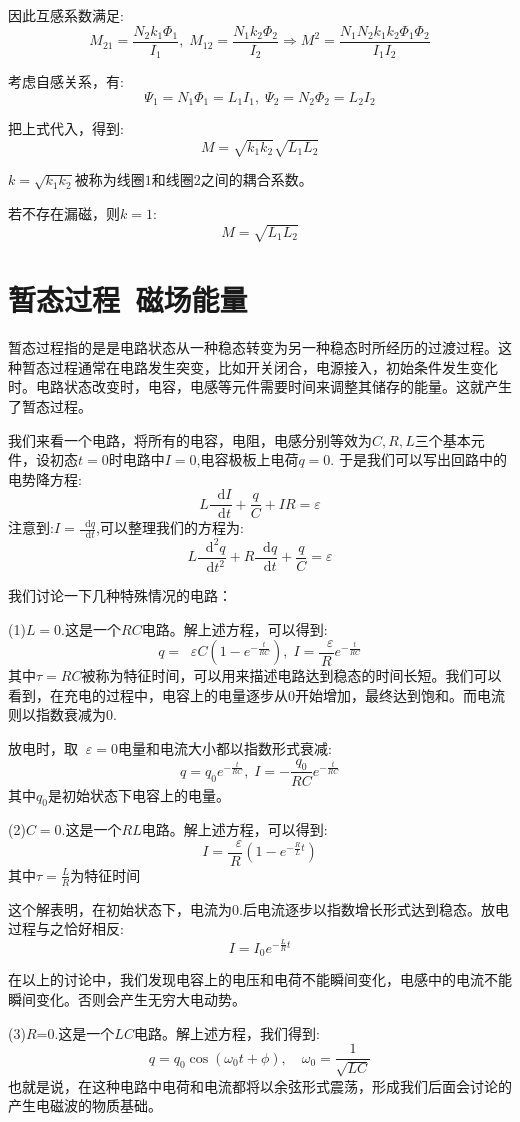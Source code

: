 \documentclass[12pt,a4paper,oneside]{report}
\theoremstyle{definition}
\theoremstyle{remark}
\renewcommand{\d}{\mathop{}\!\mathrm{d}}
\renewcommand{\v}{\mathop{}\!\varepsilon}
\begin{document}
因此互感系数满足:
\[
M_{21}=\frac{N_2k_1\Phi_1}{I_1},\;M_{12}=\frac{N_1k_2\Phi_2}{I_2}\Rightarrow M^2 =\frac{N_1N_2k_1k_2\Phi_1\Phi_2}{I_1I_2}
\]

考虑自感关系，有:
\[
\Psi_1 = N_1 \Phi_1 = L_1 I_1,\;\Psi_2 = N_2 \Phi_2 = L_2 I_2
\]

把上式代入，得到:
\[
M = \sqrt{k_1k_2}\sqrt{L_1L_2}
\]

$k=\sqrt{k_1k_2}$被称为线圈$1$和线圈$2$之间的耦合系数。

若不存在漏磁，则$k=1$:
\[
M=\sqrt{L_1L_2}
\]

\section{\texorpdfstring{暂态过程\, 磁场能量}{暂态过程 磁场能量}}
暂态过程指的是是电路状态从一种稳态转变为另一种稳态时所经历的过渡过程。这种暂态过程通常在电路发生突变，比如开关闭合，电源接入，初始条件发生变化时。电路状态改变时，电容，电感等元件需要时间来调整其储存的能量。这就产生了暂态过程。

我们来看一个电路，将所有的电容，电阻，电感分别等效为$C,R,L$三个基本元件，设初态$t=0$时电路中$I=0$,电容极板上电荷$q=0$. 于是我们可以写出回路中的电势降方程:
\[
L\frac{\d I}{\d t}+\frac{q}{C}+IR = \varepsilon
\]
注意到:$I=\frac{\d q}{\d t}$,可以整理我们的方程为:
\[
L\frac{\d^2 q}{\d t^2}+R\frac{\d q}{\d t}+\frac{q}{C}=\varepsilon
\]

我们讨论一下几种特殊情况的电路：

(1)$L=0$.这是一个$RC$电路。解上述方程，可以得到:
\[
q =\v C(1-e^{-\frac{t}{RC}}),\; I=\frac{\v}{R} e^{-\frac{t}{RC}}
\]
其中$\tau=RC$被称为特征时间，可以用来描述电路达到稳态的时间长短。我们可以看到，在充电的过程中，电容上的电量逐步从$0$开始增加，最终达到饱和。而电流则以指数衰减为$0$.

放电时，取$\v=0$电量和电流大小都以指数形式衰减:
\[
q = q_0e^{-\frac{t}{RC}},\; I = -\frac{q_0}{RC}e^{-\frac{t}{RC}}
\]
其中$q_0$是初始状态下电容上的电量。

(2)$C=0$.这是一个$RL$电路。解上述方程，可以得到:
\[
I =\frac{\v}{R}(1-e^{-\frac{R}{L}t})
\]
其中$\tau=\frac{L}{R}$为特征时间

这个解表明，在初始状态下，电流为$0$.后电流逐步以指数增长形式达到稳态。放电过程与之恰好相反:
\[
I = I_0 e^{-\frac{L}{R}t}
\]

在以上的讨论中，我们发现电容上的电压和电荷不能瞬间变化，电感中的电流不能瞬间变化。否则会产生无穷大电动势。

(3)$R$=0.这是一个$LC$电路。解上述方程，我们得到:
\[
q=q_0\cos(\omega_0 t+\phi),\quad \omega_0 = \frac{1}{\sqrt{LC}}
\]
也就是说，在这种电路中电荷和电流都将以余弦形式震荡，形成我们后面会讨论的产生电磁波的物质基础。
\end{document}

